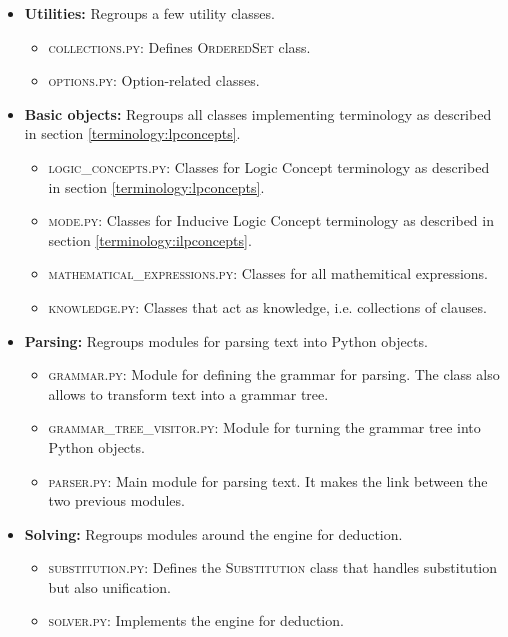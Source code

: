 \documentclass{article}
\begin{document}
\begin{itemize}
    \item \textbf{Utilities:} Regroups a few utility classes.
    \begin{itemize}
        \item \textsc{collections.py}: Defines \textsc{OrderedSet} class.
        \item \textsc{options.py}: Option-related classes.
    \end{itemize}
    
\item \textbf{Basic objects:} Regroups all classes implementing terminology
    as described in section \ref{terminology:lpconcepts}.
    \begin{itemize}
        \item \textsc{logic\_concepts.py}: Classes for Logic Concept terminology
            as described in section \ref{terminology:lpconcepts}.
        \item \textsc{mode.py}: Classes for Inducive Logic Concept terminology
            as described in section \ref{terminology:ilpconcepts}.
        \item \textsc{mathematical\_expressions.py}: Classes for all
            mathemitical expressions.
        \item \textsc{knowledge.py}: Classes that act as knowledge, i.e.
            collections of clauses.
    \end{itemize}
    
    \item \textbf{Parsing:} Regroups modules for parsing text into Python
        objects.
    \begin{itemize}
        \item \textsc{grammar.py}: Module for defining the grammar for parsing.
            The class also allows to transform text into a grammar tree.
        \item \textsc{grammar\_tree\_visitor.py}: Module for turning the grammar
            tree into Python objects.
        \item \textsc{parser.py}: Main module for parsing text. It makes the
            link between the two previous modules.
    \end{itemize}
    
    \item \textbf{Solving:} Regroups modules around the engine for deduction.
    \begin{itemize}
        \item \textsc{substitution.py}: Defines the \textsc{Substitution} class
            that handles substitution but also unification.
        \item \textsc{solver.py}: Implements the engine for deduction.
    \end{itemize}
    

\end{itemize}
\end{document}
